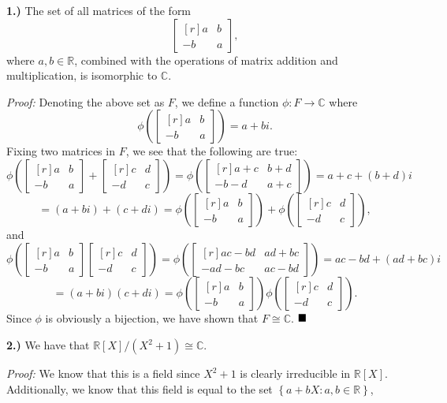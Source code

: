 \documentclass[12pt]{article}
\newcommand{\R}{\ensuremath{\mathbb{R}}}
\newcommand{\C}{\ensuremath{\mathbb{C}}}
\newcommand{\braceb}[1]{\left\{#1\right\}}
\newcommand{\parenb}[1]{\left(#1\right)}
\newcommand{\proof}{\textit{Proof: }}
\newcommand{\done}{\ensuremath{\strut\hfill\blacksquare}}
\begin{document}
\textbf{1.)}
The set of all matrices of the form
\[
	\begin{bmatrix*}[r]
		a & b \\ -b & a
	\end{bmatrix*},
\]
where \( a, b \in \R \), combined with the operations of matrix addition and
multiplication, is isomorphic to \C.

\proof
Denoting the above set as \( F \), we define a function \( \phi : F \to \C \)
where
\[
	\phi\parenb{
		\begin{bmatrix*}[r]
			a & b \\ -b & a
		\end{bmatrix*}
	} = a + bi.
\]
Fixing two matrices in \( F \), we see that the following are true:
\[
	\phi\parenb{
		\begin{bmatrix*}[r]
			a & b \\ -b & a
		\end{bmatrix*}
		+
		\begin{bmatrix*}[r]
			c & d \\ -d & c
		\end{bmatrix*}
	}
	= \phi\parenb{
		\begin{bmatrix*}[r]
			a + c & b + d \\ -b - d & a + c
		\end{bmatrix*}
	}
	= a + c + (b + d)i
\]
\[
	= (a + bi) + (c + di)
	= \phi\parenb{
		\begin{bmatrix*}[r]
			a & b \\ -b & a
		\end{bmatrix*}
	}
	+ \phi\parenb{
		\begin{bmatrix*}[r]
			c & d \\ -d & c
		\end{bmatrix*}
	},
\]
and
\[
	\phi\parenb{
		\begin{bmatrix*}[r]
			a & b \\ -b & a
		\end{bmatrix*}
		\begin{bmatrix*}[r]
			c & d \\ -d & c
		\end{bmatrix*}
	}
	= \phi\parenb{
		\begin{bmatrix*}[r]
			ac - bd & ad + bc \\ -ad - bc & ac - bd
		\end{bmatrix*}
	}
	= ac - bd + (ad + bc)i
\]
\[
	= (a + bi)(c + di)
	= \phi\parenb{
		\begin{bmatrix*}[r]
			a & b \\ -b & a
		\end{bmatrix*}
	}
	\phi\parenb{
		\begin{bmatrix*}[r]
			c & d \\ -d & c
		\end{bmatrix*}
	}.
\]
Since \( \phi \) is obviously a bijection, we have shown that \( F \cong \C \).
\done

\textbf{2.)}
We have that \( \R[X]/(X^2 + 1) \cong \C \).

\proof
We know that this is a field since \( X^2 + 1 \) is clearly irreducible in
\( \R[X] \).
Additionally, we know that this field is equal to the set
\( \braceb{a + bX : a, b \in \R} \),
\end{document}
